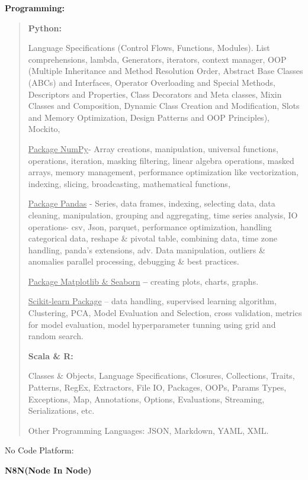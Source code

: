 \documentclass[a4paper]{article}
\begin{document}
\textbf{Programming:}

\begin{quote}
\textbf{Python:}

Language Specifications (Control Flows, Functions, Modules). List
comprehensions, lambda, Generators, iterators, context manager, OOP
(Multiple Inheritance and Method Resolution Order, Abstract Base Classes
(ABCs) and Interfaces, Operator Overloading and Special Methods,
Descriptors and Properties, Class Decorators and Meta classes, Mixin
Classes and Composition, Dynamic Class Creation and Modification, Slots
and Memory Optimization, Design Patterns and OOP Principles), Mockito,
\hl{}

\ul{Package NumPy}- Array creations, manipulation, universal functions,
operations, iteration, masking filtering, linear algebra operations,
masked arrays, memory management, performance optimization like
vectorization, indexing, slicing, broadcasting, mathematical functions,

\ul{Package Pandas} - Series, data frames, indexing, selecting data,
data cleaning, manipulation, grouping and aggregating, time series
analysis, IO operations- csv, Json, parquet, performance optimization,
handling categorical data, reshape \& pivotal table, combining data,
time zone handling, panda's extensions, adv. Data manipulation, outliers
\& anomalies parallel processing, debugging \& best practices.

\ul{Package Matplotlib \& Seaborn} \textbf{--} creating plots, charts,
graphs.

\ul{Scikit-learn Package} -- data handling, supervised learning
algorithm, Clustering, PCA, Model Evaluation and Selection, cross
validation, metrics for model evaluation, model hyperparameter tunning
using grid and random search.

\textbf{Scala \& R:}

Classes \& Objects, Language Specifications, Closures, Collections,
Traits, Patterns, RegEx, Extractors, File IO, Packages, OOPs, Params
Types, Exceptions, Map, Annotations, Options, Evaluations, Streaming,
Serializations, etc.

Other Programming Languages: JSON, Markdown, YAML, XML.
\end{quote}

No Code Platform:

\textbf{N8N(Node In Node)}
\end{document}
